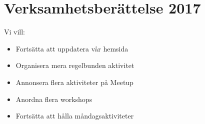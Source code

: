\documentclass[a4paper,11pt,oneside]{article}
\begin{document}
\section{Verksamhetsberättelse 2017}

Vi vill: \\
\begin{itemize}
\item Fortsätta att uppdatera vår hemsida
\item Organisera mera regelbunden aktivitet
\item Annonsera flera aktiviteter på Meetup
\item Anordna flera workshops
\item Fortsätta att hålla måndagsaktiviteter
\end{itemize}
\end{document}
